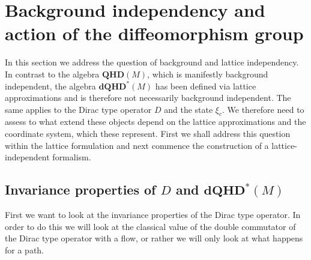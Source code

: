 \documentclass[12pt]{article}
\begin{document}
\section{Background independency
and action of the diffeomorphism group
}
\label{strong-cont}



In this section we address the question of background and lattice independency. In contrast to the algebra $\mathbf{QHD}(M)$, which is manifestly background independent, the algebra $\mathbf{dQHD}^*(M)$ has been defined via lattice approximations and is therefore not necessarily background independent. The same applies to the Dirac type operator $D$ and the state $\xi_c$. We therefore need to assess to what extend these objects depend on the lattice approximations and the coordinate system, which these represent. First we shall address this question within the lattice formulation and next  commence the construction of a lattice-independent formalism.







\subsection{Invariance properties of $D$ and $\mathbf{dQHD}^*(M)$}
\label{mozart}



First we want to look at the invariance properties of the Dirac type operator. In order to do this we will look at the classical value of the double commutator of the Dirac type operator with a flow, or rather we will only look at what happens for a path. 
\end{document}
